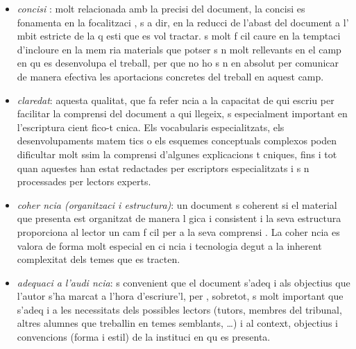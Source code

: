\begin{itemize}
   \item \emph{concisi }: molt relacionada amb la precisi  del document, la concisi  es fonamenta en la focalitzaci ,  s a dir, en la reducci  de l'abast del document a l' mbit estricte de la q esti  que es vol tractar.  s molt f cil caure en la temptaci  d'incloure en la mem ria materials que potser s n molt rellevants en el camp en qu  es desenvolupa el treball, per  que no ho s n en absolut per comunicar de manera efectiva les aportacions concretes del treball en aquest camp.
%
   \item \emph{claredat}: aquesta qualitat, que fa refer ncia a la capacitat de qui escriu per facilitar la comprensi  del document a qui llegeix,  s especialment important en l'escriptura cient fico-t cnica. Els vocabularis especialitzats, els desenvolupaments matem tics o els esquemes conceptuals complexos poden dificultar molt ssim la comprensi  d'algunes explicacions t cniques, fins i tot quan aquestes han estat redactades per escriptors especialitzats i s n processades per lectors experts.

   \item \emph{coher ncia (organitzaci  i estructura)}: un document  s coherent si el material que presenta est  organitzat de manera l gica i consistent i la seva estructura proporciona al lector un cam  f cil per a la seva comprensi . La coher ncia es valora de forma molt especial en ci ncia i tecnologia degut a la inherent complexitat dels temes que es tracten.


   \item \emph{adequaci  a l'audi ncia}:  s convenient que el document s'adeq i als objectius que l'autor s'ha marcat a l'hora d'escriure'l, per , sobretot,  s molt important que s'adeq i a les necessitats dels possibles lectors (tutors, membres del tribunal, altres alumnes que treballin en temes semblants, \ldots) i al context, objectius i convencions (forma i estil) de la instituci  en qu  es presenta.
\end{itemize}

